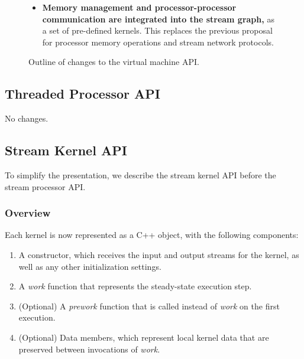 \begin{figure}[t]
\begin{center}
{\begin{minipage}{6in}
\begin{itemize}
\item {\bf Memory management and processor-processor 
communication are integrated into the stream graph,} as a set of
pre-defined kernels.  This replaces the previous proposal for
processor memory operations and stream network protocols.

\end{itemize}

\caption{Outline of changes to the virtual machine API.
  \protect\label{fig:vmdiff}}
\end{minipage}}
\end{center}
\end{figure}

\subsection{Threaded Processor API}

No changes.

\subsection{Stream Kernel API}

To simplify the presentation, we describe the stream kernel API before
the stream processor API.

\subsubsection{Overview}

Each kernel is now represented as a C++ object, with the following
components:

\begin{enumerate}

\item A constructor, which receives the input and output streams for
the kernel, as well as any other initialization settings.

\item A {\it work} function that represents the steady-state
execution step.

\item (Optional) A {\it prework} function that is called instead of
{\it work} on the first execution.

\item (Optional) Data members, which represent local kernel data that
are preserved between invocations of {\it work}.

\end{enumerate}

